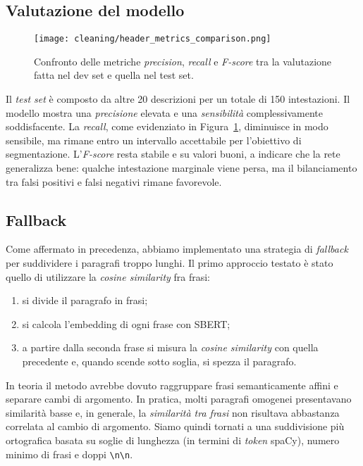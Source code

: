 \subsection{Valutazione del modello}

\begin{figure}[H]
    \centering
    \texttt{[image: cleaning/header\_metrics\_comparison.png]}
    \caption{Confronto delle metriche \textit{precision}, \textit{recall} e \textit{F-score} tra la valutazione fatta nel dev set e quella nel test set.}
    \label{fig:header-metrics}
\end{figure}

\noindent Il \textit{test set} è composto da altre 20 descrizioni per un totale di 150 intestazioni.
\noindent Il modello mostra una \textit{precisione} elevata e una \textit{sensibilità} complessivamente soddisfacente. La \textit{recall}, come evidenziato in Figura~\ref{fig:header-metrics}, diminuisce in modo sensibile, ma rimane entro un intervallo accettabile per l'obiettivo di segmentazione. L'\textit{F-score} resta stabile e su valori buoni, a indicare che la rete generalizza bene: qualche intestazione marginale viene persa, ma il bilanciamento tra falsi positivi e falsi negativi rimane favorevole.
\subsection{Fallback}

\noindent Come affermato in precedenza, abbiamo implementato una strategia di \textit{fallback} per suddividere i paragrafi troppo lunghi. Il primo approccio testato è stato quello di utilizzare la \textit{cosine similarity} fra frasi:
\begin{enumerate}
    \item si divide il paragrafo in frasi;
    \item si calcola l'embedding di ogni frase con SBERT;
    \item a partire dalla seconda frase si misura la \textit{cosine similarity} con quella precedente e, quando scende sotto soglia, si spezza il paragrafo.
\end{enumerate}
\noindent In teoria il metodo avrebbe dovuto raggruppare frasi semanticamente affini e separare cambi di argomento. In pratica, molti paragrafi omogenei presentavano similarità basse e, in generale, la \textit{similarità tra frasi} non risultava abbastanza correlata al cambio di argomento. Siamo quindi tornati a una suddivisione più ortografica basata su soglie di lunghezza (in termini di \textit{token} spaCy), numero minimo di frasi e doppi \texttt{\textbackslash n\textbackslash n}.


